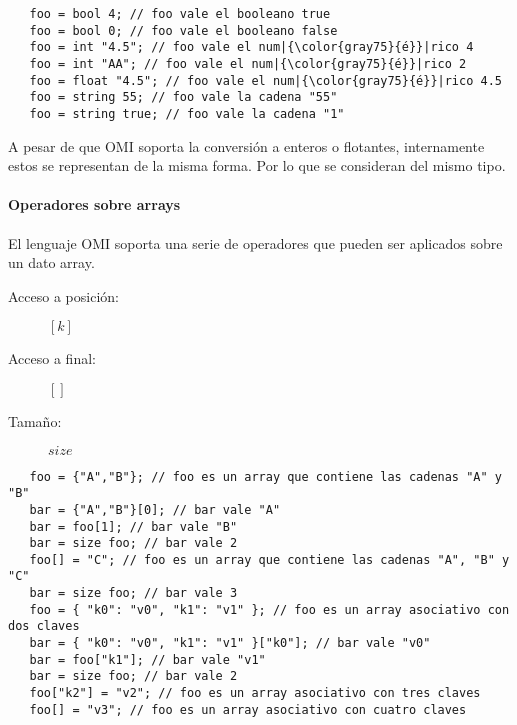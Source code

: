 \begin{lstlisting}
   foo = bool 4; // foo vale el booleano true
   foo = bool 0; // foo vale el booleano false
   foo = int "4.5"; // foo vale el num|{\color{gray75}{é}}|rico 4
   foo = int "AA"; // foo vale el num|{\color{gray75}{é}}|rico 2
   foo = float "4.5"; // foo vale el num|{\color{gray75}{é}}|rico 4.5
   foo = string 55; // foo vale la cadena "55" 
   foo = string true; // foo vale la cadena "1" 
\end{lstlisting} 

A pesar de que OMI soporta la conversión a enteros o flotantes, internamente estos se representan de la misma forma. Por lo que
se consideran del mismo tipo.


\paragraph{Operadores sobre arrays} \label{sec:op_array}
El lenguaje OMI soporta una serie de operadores que pueden ser aplicados sobre un dato array.

\begin{description}
\item [Acceso a posición:] $[k]$
\item [Acceso a final:] $[]$
\item [Tamaño:] $size$
\end{description} 

\begin{lstlisting}
   foo = {"A","B"}; // foo es un array que contiene las cadenas "A" y "B"
   bar = {"A","B"}[0]; // bar vale "A"
   bar = foo[1]; // bar vale "B"
   bar = size foo; // bar vale 2
   foo[] = "C"; // foo es un array que contiene las cadenas "A", "B" y "C"
   bar = size foo; // bar vale 3
   foo = { "k0": "v0", "k1": "v1" }; // foo es un array asociativo con dos claves
   bar = { "k0": "v0", "k1": "v1" }["k0"]; // bar vale "v0"
   bar = foo["k1"]; // bar vale "v1"
   bar = size foo; // bar vale 2
   foo["k2"] = "v2"; // foo es un array asociativo con tres claves
   foo[] = "v3"; // foo es un array asociativo con cuatro claves
\end{lstlisting} 

